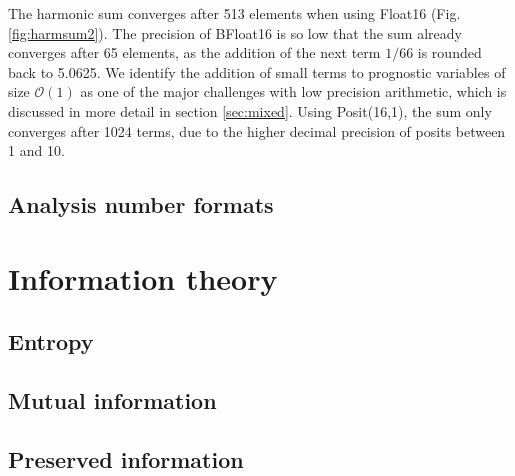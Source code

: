%
%

The harmonic sum converges after 513 elements when using Float16 (Fig. \ref{fig:harmsum2}). The precision of BFloat16
is so low that the sum already converges after 65 elements, as the addition of the next term $1/66$ is rounded back to
5.0625. We identify the addition of small terms to prognostic variables of size $\mathcal{O}(1)$ as one of the major challenges
with low precision arithmetic, which is discussed in more detail in section \ref{sec:mixed}. Using Posit(16,1), the sum only converges
after 1024 terms, due to the higher decimal precision of posits between 1 and 10.

\subsection{Analysis number formats}

\section{Information theory}
\label{sec:information}

\subsection{Entropy}
\label{sec:entropy}

\subsection{Mutual information}
\label{sec:mutual_information}

\subsection{Preserved information}
\label{sec:preserved_information}


